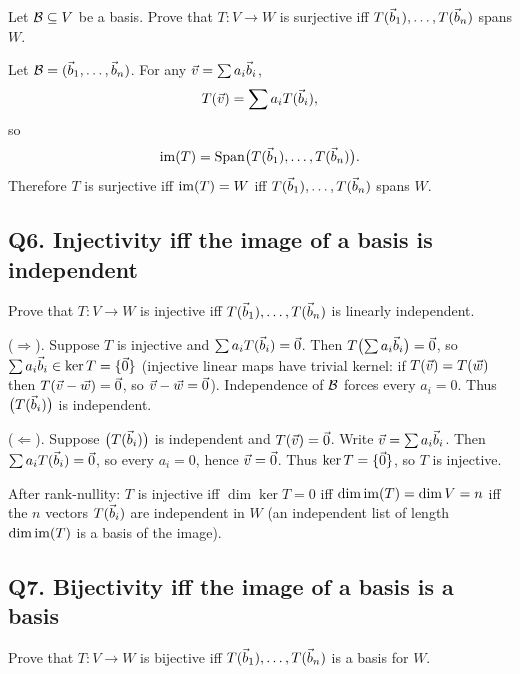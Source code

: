 \begin{promptbox}
Let $\mathcal{B}\subseteq V$ be a basis. Prove that $T:V\to W$ is surjective iff
$T(\vec{b}_1),\ldots,T(\vec{b}_n)$ spans $W$.
\end{promptbox}

\begin{coursebox}
Let $\mathcal{B}=(\vec{b}_1,\ldots,\vec{b}_n)$. For any $\vec{v}=\sum a_i\vec{b}_i$,
\[
T(\vec{v})=\sum a_i T(\vec{b}_i),
\]
so
\[
\operatorname{im}(T)=\operatorname{Span}\bigl(T(\vec{b}_1),\ldots,T(\vec{b}_n)\bigr).
\]
Therefore $T$ is surjective iff $\operatorname{im}(T)=W$ iff $T(\vec{b}_1),\ldots,T(\vec{b}_n)$ spans $W$.
\end{coursebox}

\subsection{Q6. Injectivity iff the image of a basis is independent}

\begin{promptbox}
Prove that $T:V\to W$ is injective iff $T(\vec{b}_1),\ldots,T(\vec{b}_n)$ is linearly
independent.
\end{promptbox}

\begin{coursebox}
($\Rightarrow$).
Suppose $T$ is injective and $\sum a_i T(\vec{b}_i)=\vec{0}$. Then
$T\bigl(\sum a_i\vec{b}_i\bigr)=\vec{0}$, so $\sum a_i\vec{b}_i\in\ker T=\{\vec{0}\}$
(injective linear maps have trivial kernel: if $T(\vec{v})=T(\vec{w})$ then
$T(\vec{v}-\vec{w})=\vec{0}$, so $\vec{v}-\vec{w}=\vec{0}$). Independence of $\mathcal{B}$ forces every
$a_i=0$. Thus $\bigl(T(\vec{b}_i)\bigr)$ is independent.

($\Leftarrow$).
Suppose $\bigl(T(\vec{b}_i)\bigr)$ is independent and $T(\vec{v})=\vec{0}$. Write
$\vec{v}=\sum a_i\vec{b}_i$. Then $\sum a_i T(\vec{b}_i)=\vec{0}$, so every $a_i=0$, hence
$\vec{v}=\vec{0}$. Thus $\ker T=\{\vec{0}\}$, so $T$ is injective.
\end{coursebox}

\begin{laterbox}
After rank-nullity: $T$ is injective iff $\dim\ker T=0$ iff
$\dim\operatorname{im}(T)=\dim V=n$ iff the $n$ vectors $T(\vec{b}_i)$ are independent in $W$
(an independent list of length $\dim\operatorname{im}(T)$ is a basis of the image).
\end{laterbox}

\subsection{Q7. Bijectivity iff the image of a basis is a basis}

\begin{promptbox}
Prove that $T:V\to W$ is bijective iff $T(\vec{b}_1),\ldots,T(\vec{b}_n)$ is a basis for $W$.
\end{promptbox}

